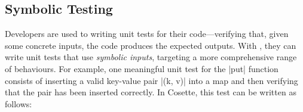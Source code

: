 

\subsection{Symbolic Testing}

Developers are used to writing unit tests for their code---verifying that, given some concrete inputs, the code produces the expected outputs. With \jilette, they can write unit tests that use \emph{symbolic inputs}, targeting a more comprehensive range of behaviours. For example, one meaningful unit test for the \jsinline|put| function consists of inserting a valid key-value pair \jsinline|(k, v)| into a map and then verifying that the pair has been inserted correctly. In Cosette, this test can be written as follows:

